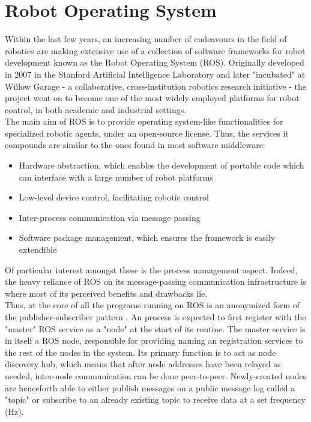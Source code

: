 \documentclass{l4proj}
\begin{document}
\section{Robot Operating System}

Within the last few years, an increasing number of endeavours in the field of robotics are making extensive use of a collection of software frameworks for robot development known as the Robot Operating System (ROS). Originally developed in 2007 in the Stanford Artificial Intelligence Laboratory and later "incubated" at Willow Garage - a collaborative, cross-institution robotics research initiative - the project went on to become one of the most widely employed platforms for robot control, in both academic and industrial settings.\\

The main aim of ROS is to provide operating system-like functionalities for specialized robotic agents, under an open-source license. Thus, the services it compounds are similar to the ones found in most software middleware:
\begin{itemize}
\item Hardware abstraction, which enables the development of portable code which can interface with a large number of robot platforms
\item Low-level device control, facilitating robotic control
\item Inter-process communication via message passing 
\item Software package management, which ensures the framework is easily extendible
\end{itemize}

Of particular interest amongst these is the process management aspect. Indeed, the heavy reliance of ROS on its message-passing communication infrastructure is where most of its perceived benefits and drawbacks lie.\\

Thus, at the core of all the programs running on ROS is an anonymized form of the publisher-subscriber pattern \cite{wiki:pub-sub}. An process is expected to first register with the "master" ROS service as a "node" \cite{node} at the start of its routine. The master service is in itself a ROS node, responsible for providing naming an registration services to the rest of the nodes in the system. Its primary function is to act as node discovery hub, which means that after node addresses have been relayed as needed, inter-node communication can be done peer-to-peer.
Newly-created nodes are henceforth able to either publish messages on a public message log called a "topic" \cite{topic} or subscribe to an already existing topic to receive data at a set frequency (Hz). \\
\end{document}
